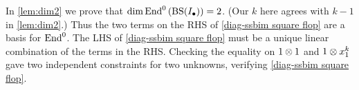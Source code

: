 In \cref{lem:dim2} we prove that $\dim \operatorname{End}^0\left(\operatorname{BS}(I_{\bullet})\right)=2$. (Our $k$ here agrees with $k-1$ in \cref{lem:dim2}.)
Thus the two terms on the RHS of \cref{diag-ssbim square flop} are a basis for $\operatorname{End}^0$. The LHS of \cref{diag-ssbim square flop} must be a unique linear combination of the terms in the RHS. Checking the equality on $1 \otimes 1$ and $1 \otimes x_1^k$ gave two independent constraints for two unknowns, verifying \cref{diag-ssbim square flop}.




